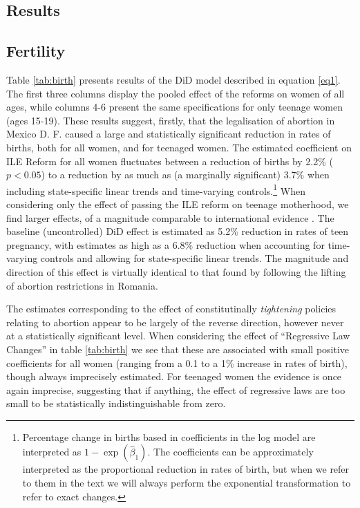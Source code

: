 \documentclass[a4paper,11pt]{article}
\begin{document}
\begin{spacing}{1.5}
\section{Results}\label{scn:results}
\subsection{Fertility}\label{main}
Table \ref{tab:birth} presents results of the DiD model described in equation \ref{eq1}.  The first three columns display the pooled effect of the reforms on women of all ages, while columns 4-6 present the same specifications for only teenage women (ages 15-19).  These results suggest, firstly, that the legalisation of abortion in Mexico D. F. caused a large and statistically significant reduction in rates of births, both for all women, and for teenaged women.  The estimated coefficient on ILE Reform for all women fluctuates between a reduction of births by 2.2\% ($p<0.05$) to a reduction by as much as (a marginally significant) 3.7\% when including state-specific linear trends and time-varying controls.\footnote{Percentage change in births based in coefficients in the log model are interpreted as $1-\exp(\hat\beta_1)$.  The coefficients can be approximately interpreted as the proportional reduction in rates of birth, but when we refer to them in the text we will always perform the exponential transformation to refer to exact changes.}  When considering only the effect of passing the ILE reform on teenage motherhood, we find larger effects, of a magnitude comparable to international evidence \citep{Bailey2006,Guldi2008,AnanatHungerman2012,Valente2014}.  The baseline (uncontrolled) DiD effect is estimated as 5.2\% reduction in rates of teen pregnancy, with estimates as high as a 6.8\% reduction when accounting for time-varying controls and allowing for state-specific linear trends.  The magnitude and direction of this effect is virtually identical to that found by \citet{PopEleches2005} following the lifting of abortion restrictions in Romania.

The estimates corresponding to the effect of constitutinally \emph{tightening} policies relating to abortion appear to be largely of the reverse direction, however never at a statistically significant level.  When considering the effect of ``Regressive Law Changes'' in table \ref{tab:birth} we see that these are associated with small positive coefficients for all women (ranging from a 0.1 to a 1\% increase in rates of birth), though always imprecisely estimated.  For teenaged women the evidence is once again imprecise, suggesting that if anything, the effect of regressive laws are too small to be statistically indistinguishable from zero.


\end{spacing}
\end{document}
